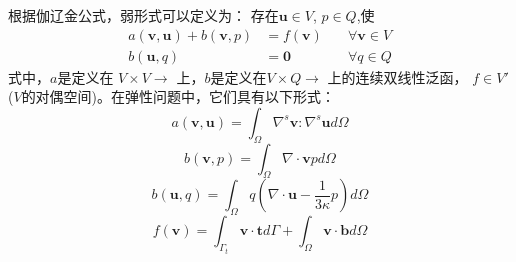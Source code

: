 根据伽辽金公式，弱形式可以定义为：
存在$\boldsymbol u \in V$, $p \in Q$,使
\begin{equation}\label{weak_mix}
    \begin{aligned}
        a(\boldsymbol v, \boldsymbol u) + b(\boldsymbol v, p) &= f(\boldsymbol v) \quad &\forall \boldsymbol v \in V \\
        b(\boldsymbol u, q) &= \boldsymbol 0 \quad &\forall q \in Q
    \end{aligned}
\end{equation}
式中，$a$是定义在 $V\times V\rightarrow$ 上，$b$是定义在$V\times Q\rightarrow $ 上的连续双线性泛函， $f\in V'$($V$的对偶空间)。在弹性问题中，它们具有以下形式：
\begin{equation}
    a(\boldsymbol v, \boldsymbol u) = \int_\Omega \nabla^s \boldsymbol v : \nabla^s \boldsymbol u d\Omega
\end{equation}
\begin{equation}
    b(\boldsymbol v, p) = \int_\Omega \nabla \cdot \boldsymbol v p d\Omega
\end{equation}
\begin{equation}
    b(\boldsymbol u, q) = \int_\Omega q(\nabla \cdot \boldsymbol u - \frac{1}{3\kappa} p)d\Omega
\end{equation}
\begin{equation}
    f(\boldsymbol v) = \int_{\Gamma_t} \boldsymbol v \cdot \boldsymbol t d\Gamma + \int_{\Omega} \boldsymbol v \cdot \boldsymbol b d\Omega
\end{equation}

